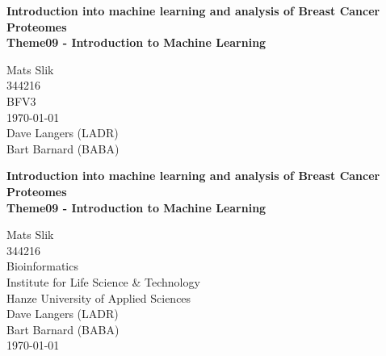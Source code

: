 

\begin{center}
  \topskip=45pt
  \LARGE{\textbf{Introduction into machine learning and analysis of Breast Cancer Proteomes}}\\
  \vspace*{20pt}
  \large{\textbf{Theme09 - Introduction to Machine Learning}}\\
  \vspace*{40pt}
\end{center}
\vspace*{\fill}
\begin{flushright}
  Mats Slik\\
  344216\\
  BFV3\\
  \today\\
  Dave Langers (LADR)\\
  Bart Barnard (BABA)\\
\end{flushright}


\newpage
\null


\newpage
\begin{center}
  \topskip=45pt
  \LARGE{\textbf{Introduction into machine learning and analysis of Breast Cancer Proteomes}}\\
  \vspace*{20pt}
  \large{\textbf{Theme09 - Introduction to Machine Learning}}\\
\end{center}
\vspace*{\fill}
\begin{flushright}
  Mats Slik\\
  344216\\
  Bioinformatics\\
  Institute for Life Science \& Technology\\
  Hanze University of Applied Sciences\\
  Dave Langers (LADR)\\
  Bart Barnard (BABA)\\
  \today\\
\end{flushright}


